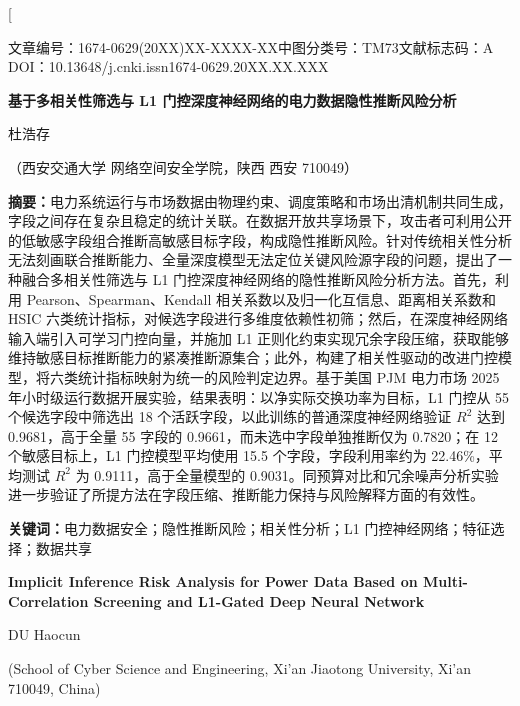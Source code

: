 \documentclass[UTF8,zihao=5,twoside]{ctexart}
\numberwithin{equation}{section}
\newcommand{\articleinfo}{文章编号：1674-0629(20XX)XX-XXXX-XX\quad 中图分类号：TM73\quad 文献标志码：A\\
DOI：10.13648/j.cnki.issn1674-0629.20XX.XX.XXX}
\begin{document}
\twocolumn[

\begin{center}
{\articleinfo}\par\vspace{1.0em}
{\sffamily{}\bfseries 基于多相关性筛选与 L1 门控深度神经网络的电力数据隐性推断风险分析}\par\vspace{0.8em}
{杜浩存}\par\vspace{0.4em}
{（西安交通大学 网络空间安全学院，陕西 西安 710049）}\par\vspace{0.8em}
\end{center}

\noindent\textbf{摘要：}电力系统运行与市场数据由物理约束、调度策略和市场出清机制共同生成，字段之间存在复杂且稳定的统计关联。在数据开放共享场景下，攻击者可利用公开的低敏感字段组合推断高敏感目标字段，构成隐性推断风险。针对传统相关性分析无法刻画联合推断能力、全量深度模型无法定位关键风险源字段的问题，提出了一种融合多相关性筛选与 L1 门控深度神经网络的隐性推断风险分析方法。首先，利用 Pearson、Spearman、Kendall 相关系数以及归一化互信息、距离相关系数和 HSIC 六类统计指标，对候选字段进行多维度依赖性初筛；然后，在深度神经网络输入端引入可学习门控向量，并施加 L1 正则化约束实现冗余字段压缩，获取能够维持敏感目标推断能力的紧凑推断源集合；此外，构建了相关性驱动的改进门控模型，将六类统计指标映射为统一的风险判定边界。基于美国 PJM 电力市场 2025 年小时级运行数据开展实验，结果表明：以净实际交换功率为目标，L1 门控从 55 个候选字段中筛选出 18 个活跃字段，以此训练的普通深度神经网络验证 $R^2$ 达到 0.9681，高于全量 55 字段的 0.9661，而未选中字段单独推断仅为 0.7820；在 12 个敏感目标上，L1 门控模型平均使用 15.5 个字段，字段利用率约为 22.46\%，平均测试 $R^2$ 为 0.9111，高于全量模型的 0.9031。同预算对比和冗余噪声分析实验进一步验证了所提方法在字段压缩、推断能力保持与风险解释方面的有效性。\par
\noindent\textbf{关键词：}电力数据安全；隐性推断风险；相关性分析；L1 门控神经网络；特征选择；数据共享\par\vspace{0.8em}

\begin{center}
{\bfseries\large Implicit Inference Risk Analysis for Power Data Based on Multi-Correlation Screening and L1-Gated Deep Neural Network}\par\vspace{0.5em}
{DU Haocun}\par\vspace{0.3em}
{\small (School of Cyber Science and Engineering, Xi'an Jiaotong University, Xi'an 710049, China)}\par\vspace{0.5em}
\end{center}
\end{document}
